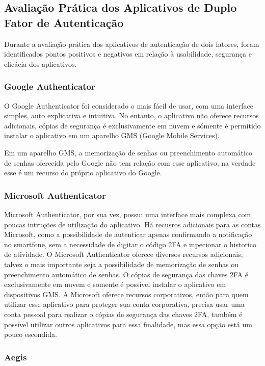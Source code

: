 \documentclass[12pt]{article}
\begin{document}
\subsection{Avaliação Prática dos Aplicativos de Duplo Fator de Autenticação}

Durante a avaliação prática dos aplicativos de autenticação de dois fatores,
foram identificados pontos positivos e negativos em relação à usabilidade,
segurança e eficácia dos aplicativos.

\subsubsection{Google Authenticator}

O Google Authenticator foi considerado o mais fácil de usar, com uma
interface simples, auto explicativa e intuitiva.
No entanto, o aplicativo não oferece recursos adicionais, cópias de segurança
é exclusivamente em nuvem e sómente é permitido instalar o aplicativo em um
aparelho GMS (Google Mobile Services).

Em um aparelho GMS, a memorização de senhas ou preenchimento automático de
senhas oferecida pelo Google não tem relação com esse aplicativo, na verdade
esse é um recurso do próprio aplicativo do Google.

\subsubsection{Microsoft Authenticator}

Microsoft Authenticator, por sua vez, possui uma interface mais complexa com
poucas intruções de utilização do aplicativo.
Há recusros adicionais para as contas Microsoft, como a possibilidade de
autenticar apenas confirmando a notificação no smartfone, sem a necessidade
de digitar o código 2FA e inpecionar o historico de atividade.
O Microsoft Authenticator oferece diversos recursos adicionais, talvez o mais
importante seja a possibilidade de memorização de senhas ou preenchimento
automático de senhas.
O cópias de segurança das chaves 2FA é exclusivamente em nuvem e somente é possível
instalar o aplicativo em dispositivos GMS.
A Microsoft oferece recursos corporativos, então para quem utilizar esse
aplicativo para proteger sua conta corporativa, precisa usar uma conta pessoal
para realizar o cópias de segurança das chaves 2FA, também é possível utilizar outros
aplicativos para essa finalidade, mas essa opção está um pouco escondida.

\subsubsection{Aegis}
\end{document}
